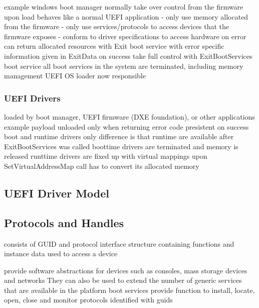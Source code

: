 
example windows boot manager
normally take over control from the firmware
upon load behaves like a normal UEFI application
- only use memory allocated from the firmware
- only use services/protocols to access devices that the firmware exposes
- conform to driver specifications to access hardware
on error can return allocated resources with Exit boot service with error specific information given in ExitData
on success take full control with ExitBootServices boot service
all boot services in the system are terminated, including memory management
UEFI OS loader now responsible

\subsubsection{UEFI Drivers}


loaded by boot manager, UEFI firmware (DXE foundation), or other applications
example payload
unloaded only when returning error code
presistent on success
boot and runtime drivers
only difference is that runtime are available after ExitBootServices was called
boottime drivers are terminated and memory is released
runttime drivers are fixed up with virtual mappings upon SetVirtualAddressMap call
has to convert its allocated memory

\subsection{\ac{UEFI} Driver Model}


\subsection{Protocols and Handles}
\cite[7.3 Protocol Handler Services]{uefi-spec}

consists of GUID and protocol interface structure containing functions and instance data used to access a device

provide software abstractions for devices such as consoles, mass storage devices and networks
They can also be used to extend the number of generic services that are available in the platform
\cite[2.4 Protocols]{uefi-spec}
boot services provide function to install, locate, open, close and monitor protocols
\cite[7.3 Protocol Handler Services]{uefi-spec}
identified with guids

